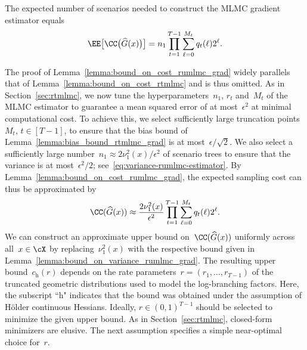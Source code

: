 \documentclass[11pt]{article}
\let\hat\widehat
\begin{document}
\begin{lemma}\label{lemma:bound_on_cost_rumlmc_grad} The expected number of scenarios needed to construct the MLMC gradient estimator equals
\begin{equation*}
    \EE\big[\CC\big(\hat{G}(x)\big)\big]= n_1\prod_{t=1}^{T-1} \sum_{\ell=0}^{M_t} q_{t}(\ell) 2^{\ell}.
\end{equation*}
\end{lemma}
The proof of Lemma~\ref{lemma:bound_on_cost_rumlmc_grad} widely parallels that of Lemma~\ref{lemma:bound_on_cost_rtmlmc} and is thus omitted. As in Section~\ref{sec:rtmlmc}, we now tune the hyperparameters~$n_1$, $r_t$ and~$M_t$ of the MLMC estimator to guarantee a mean squared error of at most~$\epsilon^2$ at minimal computational cost. To achieve this, we select sufficiently large truncation points~$M_t$, $t\in[T-1]$, to ensure that the bias bound of Lemma~\ref{lemma:bias_bound_rtmlmc_grad} is at most~$\epsilon/\sqrt{2}$. We also select a sufficiently large number~$n_1 \approx 2\nu_1^2(x)/\epsilon^2$ of scenario trees to ensure that the variance is at most~$\epsilon^2/2$; see~\eqref{eq:variance-rumlmc-estimator}. By Lemma~\ref{lemma:bound_on_cost_rumlmc_grad}, the expected sampling cost can thus be approximated by
\[
    \CC(\hat G(x)) \approx \frac{ 2\nu_1^2(x)}{\epsilon^2} \prod_{t=1}^{T-1} \sum_{\ell=0}^{M_t} q_t(\ell)2^{\ell}.
\]
We can construct an approximate upper bound on~$\CC(\hat G(x))$ uniformly across all~$x\in\cX$ by replacing~$\nu_1^2(x)$ with the respective bound given in Lemma~\ref{lemma:bound_on_variance_rumlmc_grad}. The resulting upper bound~$c_{\mathrm{h}}(r)$ depends on the rate parameters~$r = (r_1, \ldots, r_{T-1})$ of the truncated geometric distributions used to model the log-branching factors. Here, the subscript ``h" indicates that the bound was obtained under the assumption of Hölder continuous Hessians. Ideally, $r\in (0,1)^{T-1}$ should be selected to minimize the given upper bound. As in Section~\ref{sec:rtmlmc}, closed-form minimizers are elusive. The next assumption specifies a simple near-optimal choice for~$r$.
\end{document}
